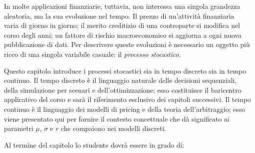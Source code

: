 In molte applicazioni finanziarie, tuttavia, non interessa una singola
grandezza aleatoria, ma la sua evoluzione nel tempo. Il prezzo di
un'attivit\`{a} finanziaria varia di giorno in giorno; il merito creditizio
di una controparte si modifica nel corso degli anni; un fattore di rischio
macroeconomico si aggiorna a ogni nuova pubblicazione di dati. Per descrivere
queste evoluzioni \`{e} necessario un oggetto pi\`{u} ricco di una singola
variabile casuale: il \emph{processo stocastico}.

Questo capitolo introduce i processi stocastici sia in tempo discreto sia in
tempo continuo. Il tempo discreto \`{e} il linguaggio naturale delle
decisioni sequenziali, della simulazione per scenari e dell'ottimizzazione;
esso costituisce il baricentro applicativo del corso e sar\`{a} il riferimento
esclusivo dei capitoli successivi. Il tempo continuo \`{e} il linguaggio dei
modelli di pricing e della teoria dell'arbitraggio; esso viene presentato
qui per fornire il contesto concettuale che d\`{a} significato ai parametri
$\mu$, $\sigma$ e $r$ che compaiono nei modelli discreti.

Al termine del capitolo lo studente dovr\`{a} essere in grado di:

